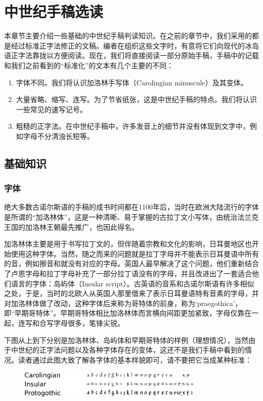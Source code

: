 \chapter{中世纪手稿选读}
本章节主要介绍一些基础的中世纪手稿判读知识。在之前的章节中，我们采用的都是经过标准正字法修正的文稿。编者在组织这些文字时，有意将它们向现代的冰岛语正字法靠拢以方便阅读。现在，我们将直接阅读一部分原始手稿，手稿中的记载和我们之前看到的“标准化”的文本有几个主要的不同：
\begin{enumerate}
    \item 字体不同。我们将认识加洛林手写体（Carolingian minuscule）及其变体。

    \item 大量省略、缩写、连写。为了节省纸张，这是中世纪手稿的特点。我们将认识一些常见的速写记号。

    \item 粗糙的正字法。在中世纪手稿中，许多发音上的细节并没有体现到文字中，例如字母不分清浊长短等。
\end{enumerate}

\section{基础知识}
\subsection{字体}
绝大多数古诺尔斯语的手稿的成书时间都在1100年后，当时在欧洲大陆流行的字体是所谓的“加洛林体”，这是一种清晰、易于掌握的古拉丁文小写体，由统治法兰克王国的加洛林王朝最先推广，也因此得名。

加洛林体主要是用于书写拉丁文的，但伴随着宗教和文化的影响，日耳曼地区也开始使用这种字体。当然，随之而来的问题就是拉丁字母并不能表示日耳曼语中所有的音，例如擦音\th 和\dh 就没有对应的字母。英国人最早解决了这个问题，他们重新结合了卢恩字母和拉丁字母补充了一部分拉丁语没有的字母，并且改进出了一套适合他们语言的字体：岛屿体（Insular script）。古英语的音系和古诺尔斯语有许多相似之处，于是，当时的北欧人从英国人那里借来了表示日耳曼语特有音素的字母，并对加洛林体做了改动，这种字体后来称为哥特体的前身，称为`praegothica'，即“早期哥特体”。早期哥特体相比加洛林体而言横向间距更加紧致，字母仅靠在一起，连写和合写字母很多，笔锋尖锐。

下图从上到下分别是加洛林体、岛屿体和早期哥特体的样例（理想情况），当然由于中世纪的正字法问题以及各种字体存在的变体，这还不是我们手稿中看到的情况。读者通过此图大致了解各字体的基本样貌即可，请不要把它当成某种标准：
\begin{figure}[htbp]
    \centering
    \includegraphics[width=0.8\textwidth]{figure/script.png}
\end{figure}

